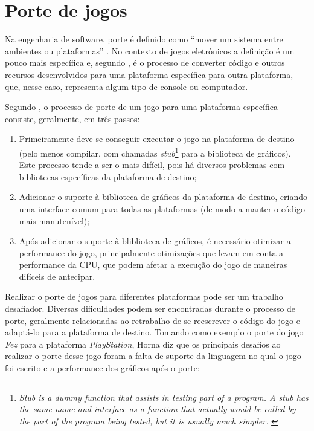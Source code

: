 \section{Porte de jogos}

Na engenharia de software, porte é definido como ``mover um sistema entre ambientes ou plataformas'' \cite{frakes}. No contexto de jogos eletrônicos a definição é um pouco mais específica e, segundo , é o processo de converter código e outros recursos desenvolvidos para uma plataforma específica para outra plataforma, que, nesse caso, representa algum tipo de console ou computador.

Segundo , o processo de porte de um jogo para uma plataforma específica consiste, geralmente, em três passos:

\begin{enumerate}
  \item Primeiramente deve-se conseguir executar o jogo na plataforma de destino (pelo menos compilar, com chamadas \textit{stub}\footnote{\textit{Stub is a dummy function that assists in testing part of a program. A stub has the same name and interface as a function that actually would be called by the part of the program being tested, but it is usually much simpler.} \cite{dale}} para a biblioteca de gráficos). Este processo tende a ser o mais difícil, pois há diversos problemas com bibliotecas específicas da plataforma de destino;
  \item Adicionar o suporte à biblioteca de gráficos da plataforma de destino, criando uma interface comum para todas as plataformas (de modo a manter o código mais manutenível);
  \item Após adicionar o suporte à bliblioteca de gráficos, é necessário otimizar a performance do jogo, principalmente otimizações que levam em conta a performance da CPU, que podem afetar a execução do jogo de maneiras difíceis de antecipar.
\end{enumerate}

Realizar o porte de jogos para diferentes plataformas pode ser um trabalho desafiador. Diversas dificuldades podem ser encontradas durante o processo de porte, geralmente relacionadas ao retrabalho de se reescrever o código do jogo e adaptá-lo para a plataforma de destino. Tomando como exemplo o porte do jogo \textit{Fez} para a plataforma \textit{PlayStation}, Horna diz que os principais desafios ao realizar o porte desse jogo foram a falta de suporte da linguagem no qual o jogo foi escrito e a performance dos gráficos após o porte:

